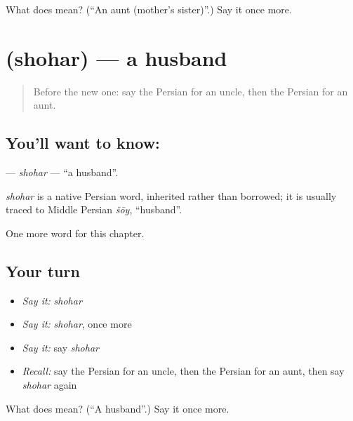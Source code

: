 \begin{tcolorbox}[breakable,colback=teal!4,colframe=teal!35!black,title={Before you move on}]
What does  mean? (\textquotedblleft{}An aunt (mother's sister)\textquotedblright{}.) Say it once more.
\end{tcolorbox}
\section[\texorpdfstring{\fa{شوهر} (shohar)}{شوهر (shohar)}]{ (shohar) — a husband}

\label{lesson:FA-C33-shohar}



\begin{quote}
Before the new one: say the Persian for an uncle, then the Persian for an aunt.
\end{quote}

\subsection*{You'll want to know: }
\textbf{} — \emph{shohar} — \textquotedblleft{}a husband\textquotedblright{}.

\begin{cousinweb}
\emph{shohar} is a native Persian word, inherited rather than borrowed; it is usually traced to Middle Persian \emph{šōy}, \textquotedblleft{}husband\textquotedblright{}.
\end{cousinweb}

\begin{grammarlens}[title={What you've built}]
One more word for this chapter.
\end{grammarlens}

\subsection*{Your turn}
\begin{itemize}
\raggedright
  \item \emph{Say it:} \emph{shohar}
  \item \emph{Say it:} \emph{shohar}, once more
  \item \emph{Say it:} say \emph{shohar}
  \item \emph{Recall:} say the Persian for an uncle, then the Persian for an aunt, then say \emph{shohar} again
\end{itemize}

\begin{tcolorbox}[breakable,colback=teal!4,colframe=teal!35!black,title={Before you move on}]
What does  mean? (\textquotedblleft{}A husband\textquotedblright{}.) Say it once more.
\end{tcolorbox}
